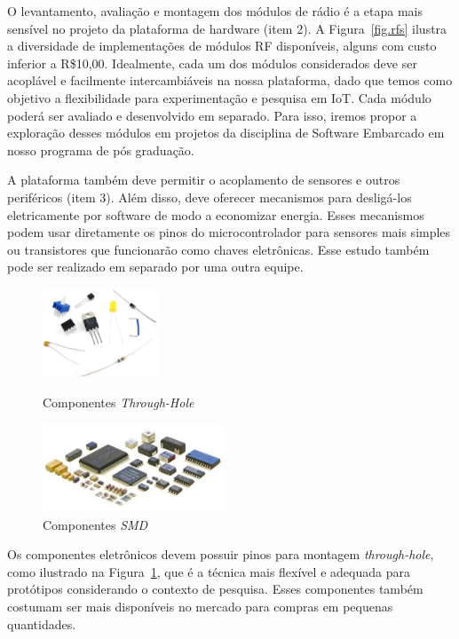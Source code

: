 \documentclass[titlepage,12pt]{article}
\begin{document}
O levantamento, avaliação e montagem dos módulos de rádio é a etapa mais
sensível no projeto da plataforma de hardware (item 2).
%
A Figura~\ref{fig.rfs} ilustra a diversidade de implementações de módulos RF
disponíveis, alguns com custo inferior a R\$10,00.
%
Idealmente, cada um dos módulos considerados deve ser acoplável e facilmente
intercambiáveis na nossa plataforma, dado que temos como objetivo a
flexibilidade para experimentação e pesquisa em IoT.
%
Cada módulo poderá ser avaliado e desenvolvido em separado.
Para isso, iremos propor a exploração desses módulos em projetos da disciplina
de Software Embarcado em nosso programa de pós graduação.

A plataforma também deve permitir o acoplamento de sensores e outros
periféricos (item 3).
%
Além disso, deve oferecer mecanismos para desligá-los eletricamente por
software de modo a economizar energia.
%
Esses mecanismos podem usar diretamente os pinos do microcontrolador para
sensores mais simples ou transistores que funcionarão como chaves eletrônicas.
%
Esse estudo também pode ser realizado em separado por uma outra equipe.

\begin{figure}[b]
\begin{minipage}{0.50\textwidth}
\includegraphics[height=100px]{through-hole}
\caption{ Componentes \emph{Through-Hole} }
\end{minipage}
\begin{minipage}{0.50\textwidth}
\includegraphics[height=100px]{smd}
\caption{ Componentes \emph{SMD} }
\end{minipage}
\label{fig.mount}
\end{figure}

Os componentes eletrônicos devem possuir pinos para montagem
\emph{through-hole}, como ilustrado na Figura~\ref{fig.mount}, que é a técnica
mais flexível e adequada para protótipos considerando o contexto de pesquisa.
%
Esses componentes também costumam ser mais disponíveis no mercado para compras
em pequenas quantidades.
\end{document}
